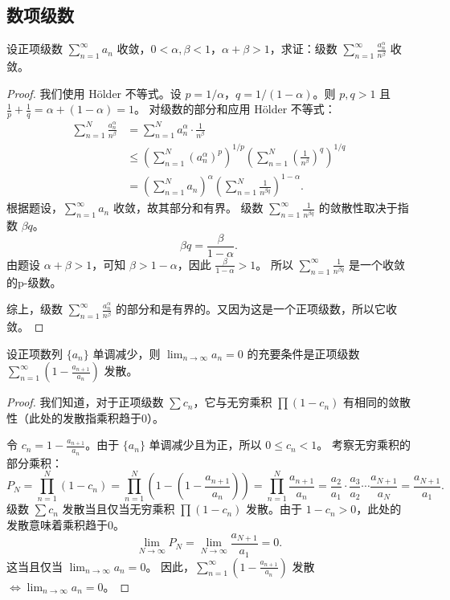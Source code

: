 \documentclass[lang=cn,10pt,thmcnt=section]{elegantbook}
\begin{document}
\subsection{数项级数}
\begin{example}
    设正项级数 $\sum_{n=1}^{\infty} a_n$ 收敛，$0 < \alpha, \beta < 1$，$\alpha + \beta > 1$，求证：级数 $\sum_{n=1}^{\infty} \frac{a_n^{\alpha}}{n^{\beta}}$ 收敛。
\end{example}
\begin{proof}
    我们使用 Hölder 不等式。设 $p = 1/\alpha$，$q = 1/(1-\alpha)$。则 $p, q > 1$ 且 $\frac{1}{p} + \frac{1}{q} = \alpha + (1-\alpha) = 1$。
    对级数的部分和应用 Hölder 不等式：
    \begin{align*}
        \sum_{n=1}^{N} \frac{a_n^{\alpha}}{n^{\beta}} &= \sum_{n=1}^{N} a_n^{\alpha} \cdot \frac{1}{n^{\beta}} \\
        &\le \left( \sum_{n=1}^{N} (a_n^{\alpha})^p \right)^{1/p} \left( \sum_{n=1}^{N} \left(\frac{1}{n^{\beta}}\right)^q \right)^{1/q} \\
        &= \left( \sum_{n=1}^{N} a_n \right)^{\alpha} \left( \sum_{n=1}^{N} \frac{1}{n^{\beta q}} \right)^{1-\alpha}.
    \end{align*}
    根据题设，$\sum_{n=1}^{\infty} a_n$ 收敛，故其部分和有界。
    级数 $\sum_{n=1}^{\infty} \frac{1}{n^{\beta q}}$ 的敛散性取决于指数 $\beta q$。
    \[ \beta q = \frac{\beta}{1-\alpha}. \]
    由题设 $\alpha + \beta > 1$，可知 $\beta > 1 - \alpha$，因此 $\frac{\beta}{1-\alpha} > 1$。
    所以 $\sum_{n=1}^{\infty} \frac{1}{n^{\beta q}}$ 是一个收敛的p-级数。
    
    综上，级数 $\sum_{n=1}^{\infty} \frac{a_n^{\alpha}}{n^{\beta}}$ 的部分和是有界的。又因为这是一个正项级数，所以它收敛。
\end{proof}

\begin{example}
    设正项数列 $\{a_n\}$ 单调减少，则 $\lim_{n \to \infty} a_n = 0$ 的充要条件是正项级数 $\sum_{n=1}^{\infty} \left(1 - \frac{a_{n+1}}{a_n}\right)$ 发散。
\end{example}
\begin{proof}
    我们知道，对于正项级数 $\sum c_n$，它与无穷乘积 $\prod (1-c_n)$ 有相同的敛散性（此处的发散指乘积趋于0）。
    
    令 $c_n = 1 - \frac{a_{n+1}}{a_n}$。由于 $\{a_n\}$ 单调减少且为正，所以 $0 \le c_n < 1$。
    考察无穷乘积的部分乘积：
    \[ P_N = \prod_{n=1}^{N} (1-c_n) = \prod_{n=1}^{N} \left(1 - \left(1 - \frac{a_{n+1}}{a_n}\right)\right) = \prod_{n=1}^{N} \frac{a_{n+1}}{a_n} = \frac{a_2}{a_1} \cdot \frac{a_3}{a_2} \cdots \frac{a_{N+1}}{a_N} = \frac{a_{N+1}}{a_1}. \]
    级数 $\sum c_n$ 发散当且仅当无穷乘积 $\prod (1-c_n)$ 发散。由于 $1-c_n > 0$，此处的发散意味着乘积趋于0。
    \[ \lim_{N\to\infty} P_N = \lim_{N\to\infty} \frac{a_{N+1}}{a_1} = 0. \]
    这当且仅当 $\lim_{n \to \infty} a_n = 0$。
    因此，$\sum_{n=1}^{\infty} \left(1 - \frac{a_{n+1}}{a_n}\right)$ 发散 $\iff \lim_{n \to \infty} a_n = 0$。
\end{proof}
\end{document}

